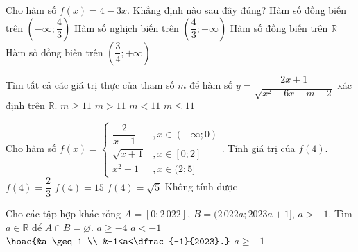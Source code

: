 \begin{ex}%
	Cho hàm số $f(x)=4-3x$. Khẳng định nào sau đây đúng?
	\choice
	{Hàm số đồng biến trên $\left(-\infty;\dfrac{4}{3}\right)$}
	{\True Hàm số nghịch biến trên $\left(\dfrac{4}{3};+\infty \right)$}
	{Hàm số đồng biến trên $\mathbb{R}$}
	{Hàm số đồng biến trên $\left(\dfrac{3}{4};+\infty \right)$}
\end{ex}\begin{ex}%
	Tìm tất cả các giá trị thực của tham số $m$ để hàm số $y=\dfrac{2x+1}{\sqrt{x^2-6x+m-2}}$ xác định trên $\mathbb{R}$.
	\choice
	{$m\ge 11$}
	{\True $m>11$}
	{$m<11$}
	{$m\le 11$}
\end{ex}
\begin{ex}%
	Cho hàm số $f(x)=\left\{\begin{array}{*{35}{l}}
	\dfrac{2}{x-1} &, x\in(-\infty;0) \\
	\sqrt{x+1} &, x\in[0;2] \\
	x^2-1 &, x\in(2;5]
	\end{array}\right.$. Tính giá trị của $f(4)$.
	\choice
	{$f(4)=\dfrac{2}{3}$}
	{\True $f(4)=15$}
	{$f(4)=\sqrt{5}$}
	{Không tính được}
	\loigiai{Do $4\in(2;5]$ nên $f(4)=4^2-1=15$.}
\end{ex}
\begin{ex}%
Cho các tập hợp khác rỗng $A=[0 ; 2\,022]$, $B=(2\,022 a ; 2023 a+1]$, $a>-1$. Tìm $a \in \mathbb{R}$ để $A \cap B=\varnothing$.
\choice
{$a \geq-4$}
{$a<-1$}
{\True $\hoac{&a \geq 1 \\ &-1<a<\dfrac{-1}{2023}.}$}
{$a \geq-1$}
\end{ex}
